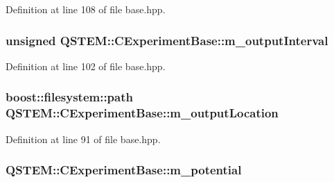 Definition at line 108 of file base.\-hpp.

\hypertarget{class_q_s_t_e_m_1_1_c_experiment_base_aab9ed4dcfb7471cf39640ee6882b4d25}{
\subsubsection[{m\-\_\-output\-Interval}]{\setlength{\rightskip}{0pt plus 5cm}unsigned Q\-S\-T\-E\-M\-::\-C\-Experiment\-Base\-::m\-\_\-output\-Interval\hspace{0.3cm}{\ttfamily [protected]}}}\label{class_q_s_t_e_m_1_1_c_experiment_base_aab9ed4dcfb7471cf39640ee6882b4d25}


Definition at line 102 of file base.\-hpp.

\hypertarget{class_q_s_t_e_m_1_1_c_experiment_base_aad5ad29836b8f1bcfa1475062fe34cda}{
\subsubsection[{m\-\_\-output\-Location}]{\setlength{\rightskip}{0pt plus 5cm}boost\-::filesystem\-::path Q\-S\-T\-E\-M\-::\-C\-Experiment\-Base\-::m\-\_\-output\-Location\hspace{0.3cm}{\ttfamily [protected]}}}\label{class_q_s_t_e_m_1_1_c_experiment_base_aad5ad29836b8f1bcfa1475062fe34cda}


Definition at line 91 of file base.\-hpp.

\hypertarget{class_q_s_t_e_m_1_1_c_experiment_base_af7edadc137c6ca92c1b66e4d5fedb50d}{
\subsubsection[{m\-\_\-potential}]{ Q\-S\-T\-E\-M\-::\-C\-Experiment\-Base\-::m\-\_\-potential\hspace{0.3cm}{\ttfamily [protected]}}}\label{class_q_s_t_e_m_1_1_c_experiment_base_af7edadc137c6ca92c1b66e4d5fedb50d}


